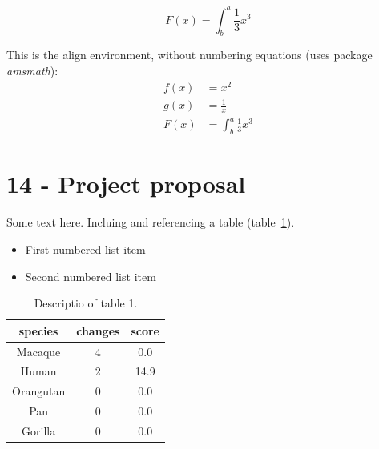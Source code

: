 \documentclass[12pt,a4paper]{report}
\begin{document}
  \begin{equation}
  F(x) = \int^a_b \frac{1}{3}x^3
 \end{equation}
 
 This is the align environment, without numbering equations (uses package {\it amsmath}): \\
 
  \begin{align*}
   f(x) &= x^2\\
   g(x) &= \frac{1}{x}\\
   F(x) &= \int^a_b \frac{1}{3}x^3
 \end{align*}
 
  \section{14 - Project proposal}
 Some text here. Incluing and referencing a table (table~\ref{table1}).
 
 \begin{itemize}
\item First numbered list item
\item Second numbered list item
\end{itemize}

\begin{table}[!htb]
  \caption{Descriptio of table 1.}
  \label{table1}
  \centering
  \begin{tabular}{ccc}
  \hline 
       species&changes&score \\
  \hline
       Macaque&4&0.0 \\
       Human&2&14.9 \\
       Orangutan&0&0.0 \\
       Pan&0&0.0 \\
       Gorilla&0&0.0 \\
  \hline
  \end{tabular}
 \end{table}
 
 
 
 


 
\end{document}
